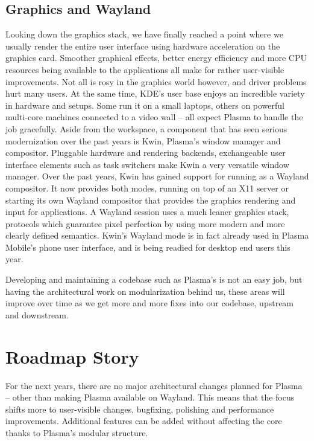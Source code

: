 \subsection*{Graphics and Wayland}

Looking down the graphics stack, we have finally reached a point where we usually render the entire user interface using hardware acceleration on the graphics card. Smoother graphical effects, better energy efficiency and more CPU resources being available to the applications all make for rather user-visible improvements. Not all is rosy in the graphics world however, and driver problems hurt many users. At the same time, KDE's user base enjoys an incredible variety in hardware and setups. Some run it on a small laptops, others on powerful multi-core machines connected to a video wall -- all expect Plasma to handle the job gracefully.
Aside from the workspace, a component that has seen serious modernization over the past years is Kwin, Plasma's window manager and compositor. Pluggable hardware and rendering backends, exchangeable user interface elements such as task switchers make Kwin a very versatile window manager. Over the past years, Kwin has gained support for running as a Wayland compositor. It now provides both modes, running on top of an X11 server or starting its own Wayland compositor that provides the graphics rendering and input for applications. A Wayland session uses a much leaner graphics stack, protocols which guarantee pixel perfection by using more modern and more clearly defined semantics. Kwin's Wayland mode is in fact already used in Plasma Mobile's phone user interface, and is being readied for desktop end users this year.

Developing and maintaining a codebase such as Plasma's is not an easy job, but having the architectural work on modularization behind us, these areas will improve over time as we get more and more fixes into our codebase, upstream and downstream.


\section*{Roadmap Story}

For the next years, there are no major architectural changes planned for Plasma -- other than making Plasma available on Wayland. This means that the focus shifts more to user-visible changes, bugfixing, polishing and performance improvements. Additional features can be added without affecting the core thanks to Plasma's modular structure.


